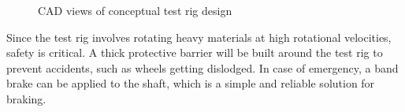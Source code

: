 \documentclass[main.tex]{subfiles}
\begin{document}
\begin{figure}
\begin{subfigure}{0.4\textwidth}
       \caption{}
       \label{fig:testrig2}
       \end{subfigure}
       \caption{CAD views of conceptual test rig design}
       \label{fig:testrig}
   \end{figure}
    
	Since the test rig involves rotating heavy materials at high rotational velocities, safety is critical. A thick protective barrier will be built around the test rig to prevent accidents, such as wheels getting dislodged. In case of emergency, a band brake can be applied to the shaft, which is a simple and reliable solution for braking.\\
\end{document}
